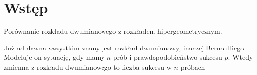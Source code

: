 \documentclass[twoside,a4paper]{book}
\begin{document}
	
\chapter{Wstęp}
Porównanie rozkładu dwumianowego z rozkładem hipergeometrycznym.

Już od dawna wszystkim \cite{Edgeworth1918} znany jest rozkład dwumianowy, inaczej Bernoulliego. Modeluje on sytuację, gdy mamy $n$ prób i prawdopodobieństwo sukcesu $p$. Wtedy zmienna z rozkładu dwumianowego to liczba sukcesu w $n$ próbach 



\end{document}
